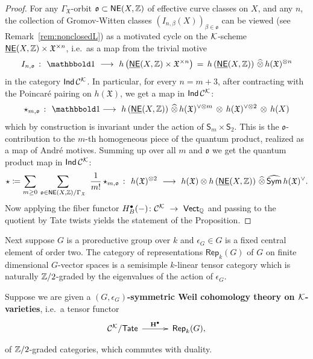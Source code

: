 \documentclass[twoside,leqno]{article}
\numberwithin{equation}{section}
\theoremstyle{plain}
\theoremstyle{definition}
\begin{document}
\begin{proof}
For any $\Gamma_{\mathfrak{X}}$-orbit $\mathfrak{o} \subset
\mathsf{NE}(X,\mathbb Z)$ of effective curve classes on $X$, and any $n$, 
the collection of Gromov-Witten classes
$\left(I_{n,\beta}(X)\right)_{\beta \in \mathfrak{o}}$ can be viewed (see Remark~\ref{rem:nonclosedL}) as
a motivated cycle on the $\mathcal K$-scheme
$\underline{\mathsf{NE}}(X,\mathbb Z)\times \mathfrak{X}^{\times n}$, i.e.\ as a map from the trivial motive
\[
I_{n,\mathfrak{o}} \ \colon \ \triv \
\longrightarrow \ h\left(\bbNE(X,\bbZ)\times \mathfrak{X}^{\times n}\right) \, = \,
h\left(\bbNE(X,\bbZ)\right)\, \widehat{\otimes}  \, h(\mathfrak{X})^{\otimes n}
\]
in the category $\mathsf{Ind}\,\mathcal{C}^{\mathcal K}$. In particular, for every
$n = m+3$, after contracting with the
Poincar\'{e} pairing on $h(\mathfrak{X})$, we get
a map in $\mathsf{Ind}\, \mathcal{C}^{\mathcal K}$:
\[
\qup_{m,\mathfrak{o}} \ \colon \ \triv
\longrightarrow \  h\left(\bbNE(X,\bbZ)\right) \, \widehat{\otimes} \,
h(\mathfrak{X})^{\vee \otimes m} \, \otimes \, h(\mathfrak{X})^{\vee \otimes 2}\, \otimes\,
h(X)
\]
which by construction is invariant under the action of
$\mathsf{S}_{m} \times \mathsf{S}_{2}$. This is the $\mathfrak{o}$-contribution
to the $m$-th homogeneous piece of
the quantum product, realized as a map of Andr\'{e} motives. Summing up
over all $m$ and $\mathfrak{o}$ we get the quantum product map in
$\mathsf{Ind}\, \mathcal{C}^{\mathcal K}$:
  \[
  \qup \coloneqq \sum_{m\geq 0}\, \sum_{\mathfrak{o} \in
    \mathsf{NE}(X,\bbZ)/\Gamma_{\mathfrak{X}}} \ \frac{1}{m!} \,
  \qup_{m,\mathfrak{o}} \ \colon
  \ h(\mathfrak{X})^{\otimes 2} \ \longrightarrow \ h(\mathfrak{X})\otimes
  h\left(\bbNE(X,\bbZ)\right) \, \widehat{\otimes} \,
  \widehat{\mathsf{Sym}} \, h(\mathfrak{X})^{\vee}. 
  \]
Now applying the fiber functor $H^{\bullet}_{B}(-) \colon \mathcal{C}^{\mathcal K} \ \to
\ \mathsf{Vect}_{\mathbb Q}$ and passing to the quotient by Tate twists yields
the statement of the Proposition.  
\end{proof}

Next suppose $G$ is a proreductive group over $k$ and $\epsilon_{G}
\in G$ is a fixed central element of order two.  The category of
representations $\mathsf{Rep}_{k}(G)$ of $G$ on finite dimensional
$G$-vector spaces is a semisimple $k$-linear tensor category which is
naturally $\mathbb Z/2$-graded by the eigenvalues of the action of
$\epsilon_{G}$.

Suppose we are given a
    {\bfseries $(G,\epsilon_{G})$-symmetric Weil cohomology theory on
      $\mathcal K$-varieties}, i.e.\ a tensor functor
\begin{equation} \label{eq:GWeil}
  \xymatrix@R-2.5pc@M+0.2pc@C+0.5pc{
 \CA{\kay}/\mathsf{Tate} \ar[r]^-{\bfH^{\bullet}}  &
  \mathsf{Rep}_{k}(G),
}
\end{equation}
of $\mathbb Z/2$-graded categories, which commutes with duality. 
\end{document}
